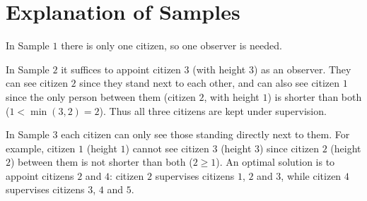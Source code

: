 \section*{Explanation of Samples}
In Sample $1$ there is only one citizen, so one observer is needed.

In Sample $2$ it suffices to appoint citizen $3$ (with height $3$) as an observer.
They can see citizen $2$ since they stand next to each other, and can also see citizen $1$ since the only person between them (citizen $2$, with height $1$) is shorter than both ($1 < \min(3, 2) = 2$).
Thus all three citizens are kept under supervision.

In Sample $3$ each citizen can only see those standing directly next to them.
For example, citizen $1$ (height $1$) cannot see citizen $3$ (height $3$) since citizen $2$ (height $2$) between them is not shorter than both ($2 \geq 1$).
An optimal solution is to appoint citizens $2$ and $4$: citizen $2$ supervises citizens $1$, $2$ and $3$, while citizen $4$ supervises citizens $3$, $4$ and $5$.

